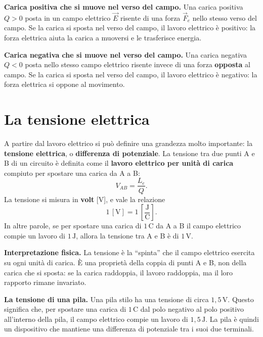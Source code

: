 \begin{esempio}
\textbf{Carica positiva che si muove nel verso del campo.} Una carica positiva \(Q > 0\) posta in un campo elettrico \(\vec{E}\) risente di una forza \(\vec{F}_e\) nello stesso verso del campo. Se la carica si sposta nel verso del campo, il lavoro elettrico è positivo: la forza elettrica aiuta la carica a muoversi e le trasferisce energia.
\end{esempio}

\begin{esempio}
\textbf{Carica negativa che si muove nel verso del campo.} Una carica negativa \(Q < 0\) posta nello stesso campo elettrico risente invece di una forza \textbf{opposta} al campo. Se la carica si sposta nel verso del campo, il lavoro elettrico è negativo: la forza elettrica si oppone al movimento.
\end{esempio}

\section{La tensione elettrica}

A partire dal lavoro elettrico si può definire una grandezza molto importante: la \textbf{tensione elettrica}, o \textbf{differenza di potenziale}. La tensione tra due punti A e B di un circuito è definita come il \textbf{lavoro elettrico per unità di carica} compiuto per spostare una carica da A a B:
\[
V_{AB} = \frac{L_e}{Q}.
\]
La tensione si misura in \textbf{volt} [\(\text{V}\)], e vale la relazione
\[
1\,[\text{V}] = 1\,\left[\frac{\text{J}}{\text{C}}\right].
\]
In altre parole, se per spostare una carica di \(1\,\text{C}\) da A a B il campo elettrico compie un lavoro di \(1\,\text{J}\), allora la tensione tra A e B è di \(1\,\text{V}\).

\begin{concetto}
\textbf{Interpretazione fisica.} La tensione è la ``spinta'' che il campo elettrico esercita su ogni unità di carica. È una proprietà della coppia di punti A e B, non della carica che si sposta: se la carica raddoppia, il lavoro raddoppia, ma il loro rapporto rimane invariato.
\end{concetto}

\begin{esempio}
\textbf{La tensione di una pila.} Una pila stilo ha una tensione di circa \(1{,}5\,\text{V}\). Questo significa che, per spostare una carica di \(1\,\text{C}\) dal polo negativo al polo positivo all'interno della pila, il campo elettrico compie un lavoro di \(1{,}5\,\text{J}\). La pila è quindi un dispositivo che mantiene una differenza di potenziale tra i suoi due terminali.
\end{esempio}


